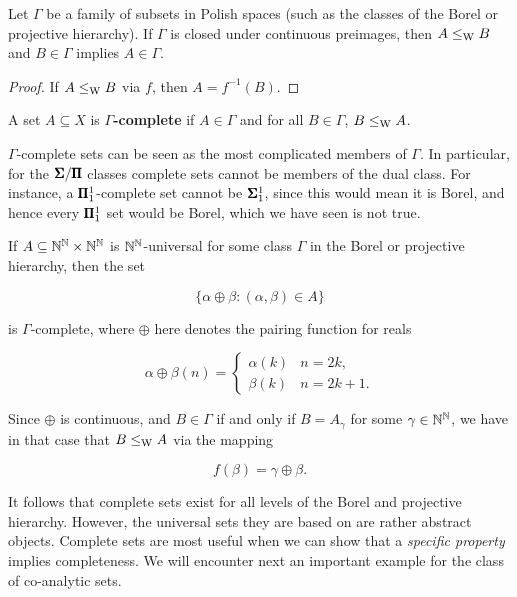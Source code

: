 \begin{proposition}\label{prop-wadge-preimages}Let $\Gamma$ be a family of subsets in Polish spaces (such as the classes of the Borel or projective hierarchy). If $\Gamma$ is closed under continuous preimages, then $A \leq_{\operatorname{W}} B$ and $B \in \Gamma$ implies $A \in \Gamma$.

\end{proposition}\begin{proof}If $A \leq_{\operatorname{W}} B$ via $f$, then $A = f^{ -1}(B)$.

\end{proof}\begin{definition}\label{def-completeness}A set $A \subseteq X$ is \textbf{$\Gamma$-complete} if $A \in \Gamma$ and for all $B \in \Gamma$, $B \leq_{\operatorname{W}} A$.

\end{definition}$\Gamma$-complete sets can be seen as the most complicated members of $\Gamma$. In particular, for the $\pmb{\Sigma}/\pmb{\Pi}$ classes complete sets cannot be members of the dual class. For instance, a $\pmb{\Pi}^1_{1}$-complete set cannot be $\pmb{\Sigma}^{1}_{1}$, since this would mean it is Borel, and hence every $\pmb{\Pi}^1_{1}$ set would be Borel, which we have seen is not true.

If $A \subseteq \mathbb{N}^{\mathbb{N}} \times \mathbb{N}^{\mathbb{N}}$ is $\mathbb{N}^{\mathbb{N}}$-universal for some class $\Gamma$ in the Borel or projective hierarchy, then the set

\begin{equation}
\{ \alpha \oplus \beta \colon (\alpha,\beta) \in A \}
\end{equation}

is $\Gamma$-complete, where $\oplus$ here denotes the pairing function for reals

\begin{equation}
\alpha\oplus\beta(n) = \begin{cases}
	 	\alpha(k) & n = 2k, \\
		\beta(k) & n = 2k+1.
	\end{cases}
\end{equation}

Since $\oplus$ is continuous, and $B \in \Gamma$ if and only if $B = A_{\gamma}$ for some $\gamma\in \mathbb{N}^{\mathbb{N}}$, we have in that case that $B \leq_{\operatorname{W}} A$ via the mapping

\begin{equation}
f(\beta) = \gamma\oplus\beta.
\end{equation}

It follows that complete sets exist for all levels of the Borel and projective hierarchy. However, the universal sets they are based on are rather abstract objects. Complete sets are most useful when we can show that a \textit{specific property} implies completeness. We will encounter next an important example for the class of co-analytic sets.

